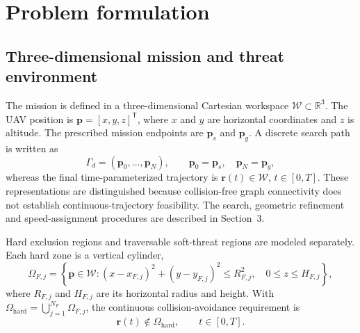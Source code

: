 \section{Problem formulation}
\label{pr:sec:problem}

\subsection{Three-dimensional mission and threat environment}
\label{pr:sec:environment}
The mission is defined in a three-dimensional Cartesian workspace
$\mathcal{W}\subset\mathbb{R}^{3}$. The UAV position is
$\mathbf{p}=[x,y,z]^{\mathsf T}$, where $x$ and $y$ are horizontal
coordinates and $z$ is altitude. The prescribed mission endpoints are
$\mathbf{p}_{s}$ and $\mathbf{p}_{g}$. A discrete search path is written as
\begin{equation}
 \Gamma_d=(\mathbf{p}_0,\ldots,\mathbf{p}_N),\qquad
 \mathbf{p}_0=\mathbf{p}_{s},\quad \mathbf{p}_N=\mathbf{p}_{g},
 \label{pr:eq:discrete}
\end{equation}
whereas the final time-parameterized trajectory is
$\mathbf{r}(t)\in\mathcal{W}$, $t\in[0,T]$. These representations are
distinguished because collision-free graph connectivity does not establish
continuous-trajectory feasibility. The search, geometric refinement and
speed-assignment procedures are described in Section~3.

Hard exclusion regions and traversable soft-threat regions are modeled
separately. Each hard zone is a vertical cylinder,
\begin{equation}
 \Omega_{F,j}=\left\{\mathbf{p}\in\mathcal{W}:
 (x-x_{F,j})^2+(y-y_{F,j})^2\le R_{F,j}^{2},\quad
 0\le z\le H_{F,j}\right\},
 \label{pr:eq:hardzone}
\end{equation}
where $R_{F,j}$ and $H_{F,j}$ are its horizontal radius and height. With
$\Omega_{\mathrm{hard}}=\bigcup_{j=1}^{N_F}\Omega_{F,j}$, the continuous
collision-avoidance requirement is
\begin{equation}
 \mathbf{r}(t)\notin\Omega_{\mathrm{hard}},\qquad t\in[0,T].
 \label{pr:eq:collision}
\end{equation}

